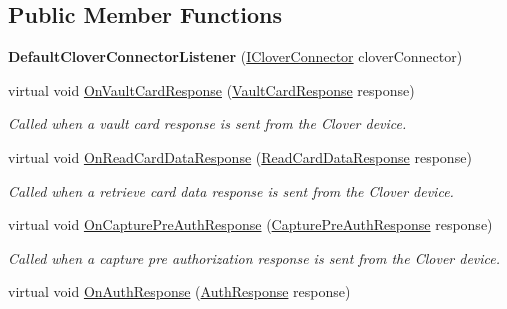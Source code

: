 \subsection*{Public Member Functions}
\begin{DoxyCompactItemize}
\item 
\mbox{\label{classcom_1_1clover_1_1remotepay_1_1sdk_1_1_default_clover_connector_listener_a3b49feb5fdc75207df4254e78ae32844}} 
{\bfseries Default\+Clover\+Connector\+Listener} (\hyperlink{interfacecom_1_1clover_1_1remotepay_1_1sdk_1_1_i_clover_connector}{I\+Clover\+Connector} clover\+Connector)
\item 
virtual void \hyperlink{classcom_1_1clover_1_1remotepay_1_1sdk_1_1_default_clover_connector_listener_a99a7cfe7cd6778bc4ec94a06e6f28420}{On\+Vault\+Card\+Response} (\hyperlink{classcom_1_1clover_1_1remotepay_1_1sdk_1_1_vault_card_response}{Vault\+Card\+Response} response)
\begin{DoxyCompactList}\small\item\em Called when a vault card response is sent from the Clover device. \end{DoxyCompactList}\item 
virtual void \hyperlink{classcom_1_1clover_1_1remotepay_1_1sdk_1_1_default_clover_connector_listener_abf40aa043a50f59be9e36c3911ac895d}{On\+Read\+Card\+Data\+Response} (\hyperlink{classcom_1_1clover_1_1remotepay_1_1sdk_1_1_read_card_data_response}{Read\+Card\+Data\+Response} response)
\begin{DoxyCompactList}\small\item\em Called when a retrieve card data response is sent from the Clover device. \end{DoxyCompactList}\item 
virtual void \hyperlink{classcom_1_1clover_1_1remotepay_1_1sdk_1_1_default_clover_connector_listener_a8b16a6574748f4ae7852d710c169a86e}{On\+Capture\+Pre\+Auth\+Response} (\hyperlink{classcom_1_1clover_1_1remotepay_1_1sdk_1_1_capture_pre_auth_response}{Capture\+Pre\+Auth\+Response} response)
\begin{DoxyCompactList}\small\item\em Called when a capture pre authorization response is sent from the Clover device. \end{DoxyCompactList}\item 
virtual void \hyperlink{classcom_1_1clover_1_1remotepay_1_1sdk_1_1_default_clover_connector_listener_afbe9b03563cc7129384a094eae1adbe5}{On\+Auth\+Response} (\hyperlink{classcom_1_1clover_1_1remotepay_1_1sdk_1_1_auth_response}{Auth\+Response} response)

\end{DoxyCompactItemize}

